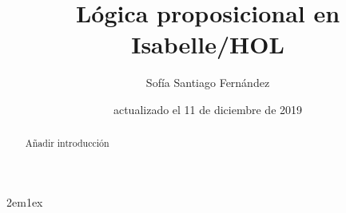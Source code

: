 \documentclass[12pt,a4paper]{article}
\begin{document}
\title{Lógica proposicional en Isabelle/HOL}
\author{Sofía Santiago Fernández}
\date{actualizado el 11 de diciembre de 2019}
\maketitle


\begin{abstract}
  Añadir introducción
\end{abstract}

\tableofcontents

\parindent 2em\parskip 1ex



\nocite{LMF, tutorial,fitting1996first,CC}




\todototoc
\listoftodos
\end{document}
